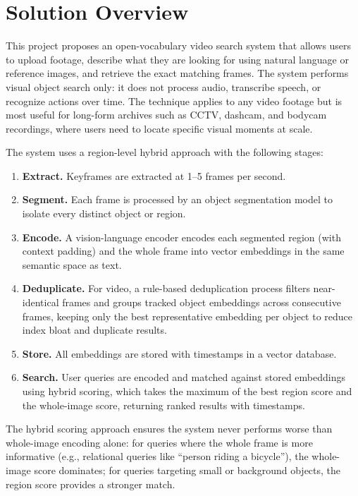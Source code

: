 \section{Solution Overview}
\label{section:solution-overview}

This project proposes an open-vocabulary video search system that allows users to upload footage, describe what they are looking for using natural language or reference images, and retrieve the exact matching frames. The system performs visual object search only: it does not process audio, transcribe speech, or recognize actions over time. The technique applies to any video footage but is most useful for long-form archives such as CCTV, dashcam, and bodycam recordings, where users need to locate specific visual moments at scale.

The system uses a region-level hybrid approach with the following stages:

\begin{enumerate}
    \item \textbf{Extract.} Keyframes are extracted at 1--5 frames per second.
    \item \textbf{Segment.} Each frame is processed by an object segmentation model to isolate every distinct object or region.
    \item \textbf{Encode.} A vision-language encoder encodes each segmented region (with context padding) and the whole frame into vector embeddings in the same semantic space as text.
    \item \textbf{Deduplicate.} For video, a rule-based deduplication process filters near-identical frames and groups tracked object embeddings across consecutive frames, keeping only the best representative embedding per object to reduce index bloat and duplicate results.
    \item \textbf{Store.} All embeddings are stored with timestamps in a vector database.
    \item \textbf{Search.} User queries are encoded and matched against stored embeddings using hybrid scoring, which takes the maximum of the best region score and the whole-image score, returning ranked results with timestamps.
\end{enumerate}

The hybrid scoring approach ensures the system never performs worse than whole-image encoding alone: for queries where the whole frame is more informative (e.g., relational queries like ``person riding a bicycle''), the whole-image score dominates; for queries targeting small or background objects, the region score provides a stronger match.

